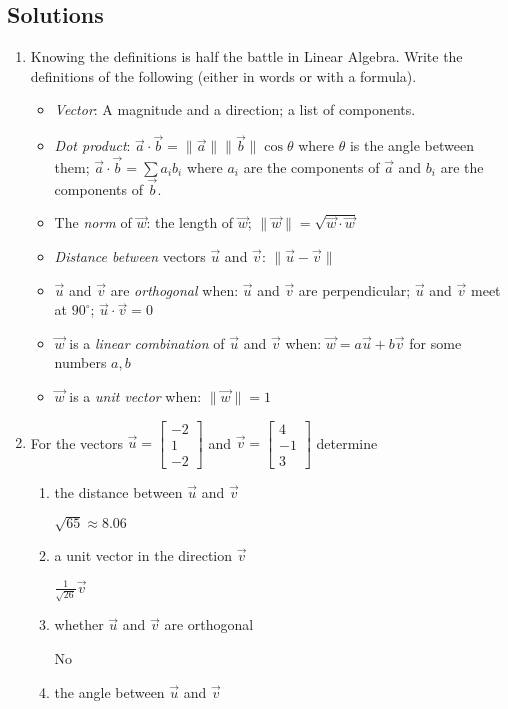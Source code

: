 \documentclass[11pt]{exam}
\newcommand{\mat}[1]{\begin{bmatrix}#1\end{bmatrix}}
\begin{document}
\subsection*{Solutions}
\begin{enumerate}
	\item Knowing the definitions is half the battle in Linear Algebra.
	Write the definitions of the following (either in words or with a formula).
	\begin{itemize}
		\item  \emph{Vector}: A magnitude and a direction; a list of components.
		\item  \emph{Dot product}: $\vec a\cdot \vec b=\|\vec a\|\|\vec b\|\cos \theta$
		where $\theta$ is the angle between them; $\vec a\cdot \vec b=\sum a_ib_i$
		where $a_i$ are the components of $\vec a$ and $b_i$ are the components 
		of $\vec b$.
		\item  The \emph{norm} of $\vec w$: the length of $\vec w$; $\|\vec w\|=\sqrt{
		\vec w\cdot \vec w}$ 
		\item  \emph{Distance between} vectors $\vec u$ and $\vec v$: $\|\vec u-\vec v\|$
		\item  $\vec u$ and $\vec v$ are \emph{orthogonal} when: $\vec u$ and $\vec v$
		are perpendicular; $\vec u$ and $\vec v$ meet at $90^\circ$; $\vec u\cdot \vec v=0$
		\item  $\vec w$ is a \emph{linear combination} of $\vec u$ and $\vec v$ when: 
		$\vec w=a\vec u+b\vec v$ for some numbers $a,b$
		\item  $\vec w$ is a \emph{unit vector} when: $\|\vec w\|=1$
	\end{itemize}

	\item For the vectors $\vec u=\mat{-2\\1\\-2}$ and $\vec v=\mat{4\\-1\\3}$ determine
	\begin{enumerate}
		\item the distance between $\vec u$ and $\vec v$

		$\sqrt{65}\approx 8.06$
		\item a unit vector in the direction $\vec v$
		
		$\frac{1}{\sqrt{26}}\vec v$
		\item whether $\vec u$ and $\vec v$ are orthogonal

		No
		\item the angle between $\vec u$ and $\vec v$


\end{enumerate}
\end{enumerate}
\end{document}
